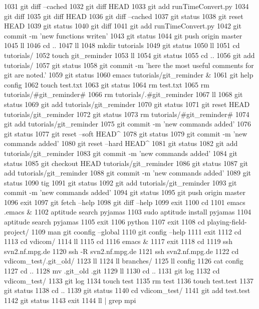  1031  git diff --cached
 1032  git diff HEAD
 1033  git add runTimeConvert.py
 1034  git diff
 1035  git diff HEAD
 1036  git diff --cached
 1037  git status
 1038  git reset HEAD
 1039  git status
 1040  git diff
 1041  git add runTimeConvert.py
 1042  git commit -m 'new functions writen'
 1043  git status
 1044  git push origin master
 1045  ll
 1046  cd ..
 1047  ll
 1048  mkdir tutorials
 1049  git status
 1050  ll
 1051  cd tutorials/
 1052  touch git_reminder
 1053  ll
 1054  git status
 1055  cd ..
 1056  git add tutorials/
 1057  git status
 1058  git commit -m 'here the most useful comments for git are noted.'
 1059  git status
 1060  emacs tutorials/git_reminder &
 1061  git help config
 1062  touch test.txt
 1063  git status
 1064  rm test.txt 
 1065  rm tutorials/#git_reminder# 
 1066  rm tutorials/.#git_reminder 
 1067  ll
 1068  git status
 1069  git add tutorials/git_reminder
 1070  git status
 1071  git reset HEAD tutorials/git_reminder
 1072  git status
 1073  rm tutorials/#git_reminder# 
 1074  git add tutorials/git_reminder
 1075  git commit -m 'new commands added'
 1076  git status
 1077  git reset --soft HEAD^
 1078  git status
 1079  git commit -m 'new commands added'
 1080  git reset --hard HEAD^
 1081  git status
 1082  git add tutorials/git_reminder
 1083  git commit -m 'new commands added'
 1084  git status
 1085  git checkout HEAD tutorials/git_reminder
 1086  git status
 1087  git add tutorials/git_reminder
 1088  git commit -m 'new commands added'
 1089  git status
 1090  tig
 1091  git status
 1092  git add tutorials/git_reminder
 1093  git commit -m 'new commands added'
 1094  git status
 1095  git push origin master
 1096  exit
 1097  git fetch --help
 1098  git diff --help
 1099  exit
 1100  cd
 1101  emacs .emacs &
 1102  aptitude search pyjamas
 1103  sudo aptitude install pyjamas
 1104  aptitude search pyjamas
 1105  exit
 1106  python
 1107  exit
 1108  cd playing-field-project/
 1109  man git coonfig --global 
 1110  git config --help
 1111  exit
 1112  cd
 1113  cd vdicom/
 1114  ll
 1115  cd
 1116  emacs &
 1117  exit
 1118  cd
 1119  ssh svn2.nf.mpg.de
 1120  ssh -R svn2.nf.mpg.de
 1121  ssh svn2.nf.mpg.de
 1122  cd vdicom_test/.git_old/
 1123  ll
 1124  ll branches/
 1125  ll config 
 1126  cat config 
 1127  cd ..
 1128  mv .git_old .git
 1129  ll
 1130  cd ..
 1131  git log
 1132  cd vdicom_test/
 1133  git log
 1134  touch test
 1135  rm test 
 1136  touch test.test
 1137  git status
 1138  cd ..
 1139  git status
 1140  cd vdicom_test/
 1141  git add test.test
 1142  git status
 1143  exit
 1144  ll | grep mpi
